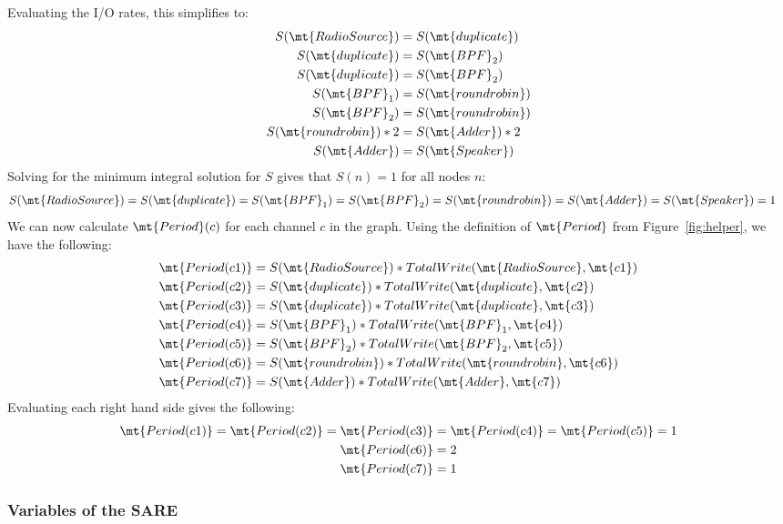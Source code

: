 Evaluating the I/O rates, this simplifies to:
\begin{align*}
S(\mt{RadioSource}) &= S(\mt{duplicate}) \\
S(\mt{duplicate})  &= S(\mt{BPF}_2) \\
S(\mt{duplicate})  &= S(\mt{BPF}_2) \\
S(\mt{BPF}_1) &= S(\mt{roundrobin}) \\
S(\mt{BPF}_2) &= S(\mt{roundrobin}) \\
S(\mt{roundrobin}) * 2 &= S(\mt{Adder}) * 2 \\
S(\mt{Adder}) &= S(\mt{Speaker})
\end{align*}
Solving for the minimum integral solution for $S$ gives that $S(n) = 1$ for all nodes $n$:
\begin{align*}
S(\mt{RadioSource}) &= S(\mt{duplicate}) = S(\mt{BPF}_1) = S(\mt{BPF}_2) = S(\mt{roundrobin}) = S(\mt{Adder}) = S(\mt{Speaker}) = 1
\end{align*}
We can now calculate $\mt{Period}(c)$ for each channel $c$ in the
graph.  Using the definition of $\mt{Period}$ from
Figure~\ref{fig:helper}, we have the following:
\begin{align*}
\mt{Period(c1)} &= S(\mt{RadioSource}) * TotalWrite(\mt{RadioSource}, \mt{c1}) \\
\mt{Period(c2)} &= S(\mt{duplicate}) * TotalWrite(\mt{duplicate}, \mt{c2}) \\
\mt{Period(c3)} &= S(\mt{duplicate}) * TotalWrite(\mt{duplicate}, \mt{c3}) \\
\mt{Period(c4)} &= S(\mt{BPF}_1) * TotalWrite(\mt{BPF}_1, \mt{c4}) \\
\mt{Period(c5)} &= S(\mt{BPF}_2) * TotalWrite(\mt{BPF}_2, \mt{c5}) \\
\mt{Period(c6)} &= S(\mt{roundrobin}) * TotalWrite(\mt{roundrobin}, \mt{c6}) \\
\mt{Period(c7)} &= S(\mt{Adder}) * TotalWrite(\mt{Adder}, \mt{c7})
\end{align*}
Evaluating each right hand side gives the following:
\begin{align*}
\mt{Period(c1)} = \mt{Period(c2)} = \mt{Period(c3)} &= \mt{Period(c4)} = \mt{Period(c5)} = 1 \\
\mt{Period(c6)} &= 2 \\
\mt{Period(c7)} &= 1 
\end{align*}

\subsubsection{Variables of the SARE}

